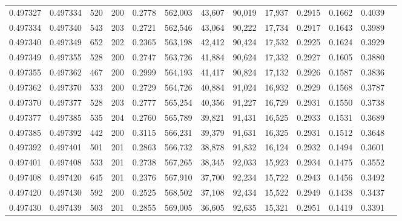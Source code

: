 \begin{tabular}{rrrrrrrrrrrrr}
0.497327 & 0.497334 &   520 & 200 &                                     0.2778 & 562,003 &  43,607 &  90,019 &  17,937 & 0.2915 & 0.1662 & 0.4039 \\
0.497334 & 0.497340 &   543 & 203 &                                     0.2721 & 562,546 &  43,064 &  90,222 &  17,734 & 0.2917 & 0.1643 & 0.3989 \\
0.497340 & 0.497349 &   652 & 202 &                                     0.2365 & 563,198 &  42,412 &  90,424 &  17,532 & 0.2925 & 0.1624 & 0.3929 \\
0.497349 & 0.497355 &   528 & 200 &                                     0.2747 & 563,726 &  41,884 &  90,624 &  17,332 & 0.2927 & 0.1605 & 0.3880 \\
0.497355 & 0.497362 &   467 & 200 &                                     0.2999 & 564,193 &  41,417 &  90,824 &  17,132 & 0.2926 & 0.1587 & 0.3836 \\
0.497362 & 0.497370 &   533 & 200 &                                     0.2729 & 564,726 &  40,884 &  91,024 &  16,932 & 0.2929 & 0.1568 & 0.3787 \\
0.497370 & 0.497377 &   528 & 203 &                                     0.2777 & 565,254 &  40,356 &  91,227 &  16,729 & 0.2931 & 0.1550 & 0.3738 \\
0.497377 & 0.497385 &   535 & 204 &                                     0.2760 & 565,789 &  39,821 &  91,431 &  16,525 & 0.2933 & 0.1531 & 0.3689 \\
0.497385 & 0.497392 &   442 & 200 &                                     0.3115 & 566,231 &  39,379 &  91,631 &  16,325 & 0.2931 & 0.1512 & 0.3648 \\
0.497392 & 0.497401 &   501 & 201 &                                     0.2863 & 566,732 &  38,878 &  91,832 &  16,124 & 0.2932 & 0.1494 & 0.3601 \\
0.497401 & 0.497408 &   533 & 201 &                                     0.2738 & 567,265 &  38,345 &  92,033 &  15,923 & 0.2934 & 0.1475 & 0.3552 \\
0.497408 & 0.497420 &   645 & 201 &                                     0.2376 & 567,910 &  37,700 &  92,234 &  15,722 & 0.2943 & 0.1456 & 0.3492 \\
0.497420 & 0.497430 &   592 & 200 &                                     0.2525 & 568,502 &  37,108 &  92,434 &  15,522 & 0.2949 & 0.1438 & 0.3437 \\
0.497430 & 0.497439 &   503 & 201 &                                     0.2855 & 569,005 &  36,605 &  92,635 &  15,321 & 0.2951 & 0.1419 & 0.3391 \\

\end{tabular}

